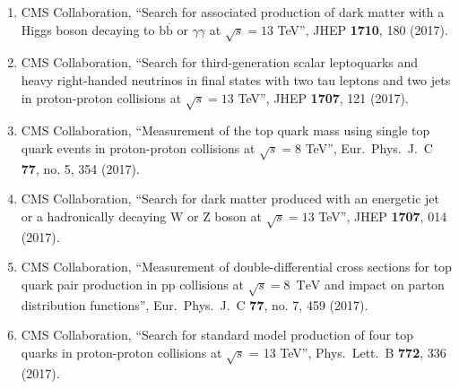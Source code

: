 \begin{itemize}
\begin{enumerate}
\item CMS Collaboration, ``Search for associated production of dark matter with a Higgs boson decaying to $ \mathrm{b}\overline{\mathrm{b}} $ or $\gamma \gamma$ at $ \sqrt{s}=13$ TeV'', JHEP {\bf 1710}, 180 (2017).

\item CMS Collaboration, ``Search for third-generation scalar leptoquarks and heavy right-handed neutrinos in final states with two tau leptons and two jets in proton-proton collisions at $ \sqrt{s}=13 $ TeV'', JHEP {\bf 1707}, 121 (2017).

\item CMS Collaboration, ``Measurement of the top quark mass using single top quark events in proton-proton collisions at $\sqrt{s}= 8$  TeV'', Eur.\ Phys.\ J.\ C {\bf 77}, no. 5, 354 (2017).

\item CMS Collaboration, ``Search for dark matter produced with an energetic jet or a hadronically decaying W or Z boson at $ \sqrt{s}=13 $ TeV'', JHEP {\bf 1707}, 014 (2017).

\item CMS Collaboration, ``Measurement of double-differential cross sections for top quark pair production in pp collisions at $\sqrt{s} = 8$ $\,\text {TeV}$ and impact on parton distribution functions'', Eur.\ Phys.\ J.\ C {\bf 77}, no. 7, 459 (2017).

\item CMS Collaboration, ``Search for standard model production of four top quarks in proton-proton collisions at $\sqrt{s}$ = 13 TeV'', Phys.\ Lett.\ B {\bf 772}, 336 (2017).


\end{enumerate}
\end{itemize}
